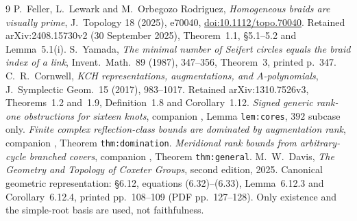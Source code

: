 \documentclass[11pt]{article}
\begin{document}
\begin{thebibliography}{9}\small
{} P.~Feller, L.~Lewark and M.~Orbegozo Rodriguez,
\emph{Homogeneous braids are visually prime}, J.~Topology 18 (2025),
e70040, \href{https://doi.org/10.1112/topo.70040}{doi:10.1112/topo.70040}.
Retained arXiv:2408.15730v2 (30 September 2025), Theorem~1.1,
\S5.1--5.2 and Lemma~5.1(i).
 S.~Yamada, \emph{The minimal number of Seifert circles
equals the braid index of a link}, Invent.~Math.~89 (1987), 347--356,
Theorem~3, printed p.~347.
 C.~R.~Cornwell, \emph{KCH representations,
augmentations, and $A$-polynomials}, J.~Symplectic Geom.~15 (2017),
983--1017. Retained arXiv:1310.7526v3, Theorems~1.2 and~1.9,
Definition~1.8 and Corollary~1.12.
 \emph{Signed generic rank-one obstructions for
sixteen knots}, companion ,
Lemma \texttt{lem:cores}, $392$ subcase only.
 \emph{Finite complex reflection-class bounds are
dominated by augmentation rank}, companion
,
Theorem \texttt{thm:domination}.
 \emph{Meridional rank bounds from arbitrary-cycle
branched covers}, companion
,
Theorem \texttt{thm:general}.
 M.~W.~Davis, \emph{The Geometry and Topology of
Coxeter Groups}, second edition, 2025. Canonical geometric
representation: \S6.12, equations (6.32)--(6.33), Lemma~6.12.3
and Corollary~6.12.4, printed pp.~108--109 (PDF pp.~127--128).
Only existence and the simple-root basis are used, not faithfulness.
\end{thebibliography}
\end{document}
